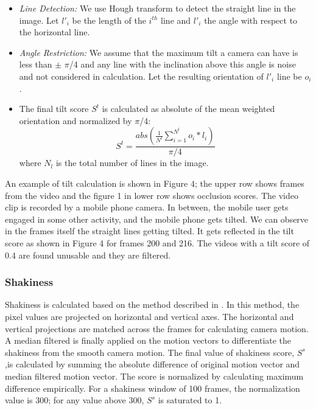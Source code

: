 \documentclass{sig-alternate}
\begin{document}
\begin{itemize}
\item  \textit{Line Detection:} We use Hough transform to detect the straight line in the image. Let \(l'_i\) be the length of the \(i^{th}\) line and \(l'_i\) the angle with respect to the horizontal line.
\item \textit{Angle Restriction:} We assume that the maximum tilt a camera can have is less than $\pm$ $\pi$/4 and any line with the inclination above this angle is noise and not considered in calculation. Let the resulting orientation of \(l'_i\) line be \(o_i\). 
\item The final tilt score \(S^t\) is calculated as absolute of the mean weighted orientation and normalized by $\pi$/4:
\begin{equation}
S^t = \frac{abs( \frac{1}{N^l}\sum_{i=1}^{N^l}o_i*l_i )}{\pi/4} 
\end{equation}
where \(N_l\) is the total number of lines in the image.
\end{itemize}

An example of tilt calculation is shown in Figure 4; the upper row shows frames from the video and the figure 1 in lower row shows occlusion scores. The video clip is recorded by a mobile phone camera. In between, the mobile user gets engaged in some other activity, and the mobile phone gets tilted. We can observe in the frames itself the straight lines getting tilted. It gets reflected in the tilt score as shown in Figure 4 for frames 200 and 216. The videos with a tilt score of 0.4 are found unusable and they are filtered. 

\subsubsection{Shakiness}
Shakiness is calculated based on the method described in \cite{saini2012movimash}. In this method, the pixel values are projected on horizontal and vertical axes. The horizontal and vertical projections are matched across the frames for calculating camera motion. A median filtered is finally applied on the motion vectors to differentiate the shakiness from the smooth camera motion. The ﬁnal value of shakiness score, \(S^s\),is calculated by summing the absolute difference of original motion vector and median ﬁltered motion vector. The score is normalized by calculating maximum difference empirically. For a shakiness window of 100 frames, the normalization value is 300; for any value above 300, \(S^s\) is saturated to 1.
\end{document}

